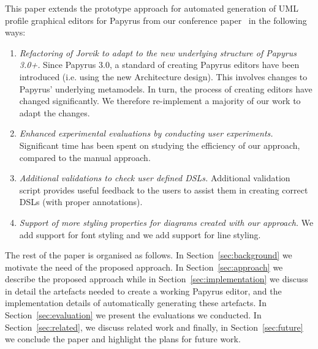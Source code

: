 This paper extends the prototype approach for automated generation of UML profile graphical editors for Papyrus from our conference paper~\cite{zolotas2018towards} in the following ways:
\begin{enumerate}
	\item \textit{Refactoring of \textit{Jorvik} to adapt to the new underlying structure of Papyrus 3.0+.} 
	Since Papyrus 3.0, a standard of creating Papyrus editors have been introduced (i.e. using the new Architecture design). 
	This involves changes to Papyrus' underlying metamodels. 
	In turn, the process of creating editors have changed significantly.
	We therefore re-implement a majority of our work to adapt the changes. 
	\item \textit{Enhanced experimental evaluations by conducting user experiments.}
	Significant time has been spent on studying the efficiency of our approach, compared to the manual approach.
	\item \textit{Additional validations to check user defined DSLs.} Additional validation script provides useful feedback to the users to assist them in creating correct DSLs (with proper annotations).
	\item \textit{Support of more styling properties for diagrams created with our approach.} We add support for font styling and we add support for line styling.

\end{enumerate}
The rest of the paper is organised as follows. 
In Section~\ref{sec:background} we motivate the need of the proposed approach. 
In Section~\ref{sec:approach} we describe the proposed approach while 
in Section~\ref{sec:implementation} we discuss in detail the artefacts needed to create a working Papyrus editor, and the implementation details of automatically generating these artefacts. 
In Section~\ref{sec:evaluation} we present the evaluations we conducted.
In Section~\ref{sec:related}, we discuss related work and finally, in Section~\ref{sec:future} we conclude the paper and highlight the plans for future work.